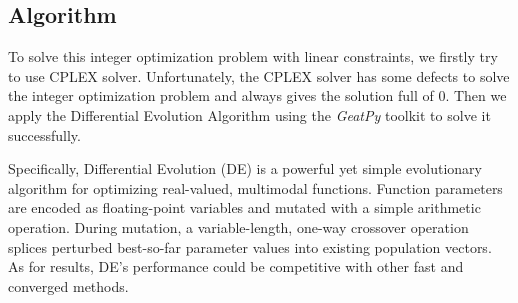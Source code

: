




\subsection{Algorithm}

To solve this integer optimization problem with linear constraints, we firstly try to use CPLEX solver. Unfortunately, the CPLEX solver has some defects to solve the integer optimization problem and always gives the solution full of 0. Then we apply the Differential Evolution Algorithm using the \emph{GeatPy}\cite{geatpy} toolkit to solve it successfully. 

Specifically, Differential Evolution (DE) is a powerful yet simple
evolutionary algorithm for optimizing real-valued, multimodal functions. Function parameters are encoded as floating-point variables and mutated with a simple arithmetic operation. During mutation, a variable-length, one-way crossover operation splices perturbed best-so-far parameter values into existing population vectors. As for results, DE's performance could be competitive with other fast and converged methods.
